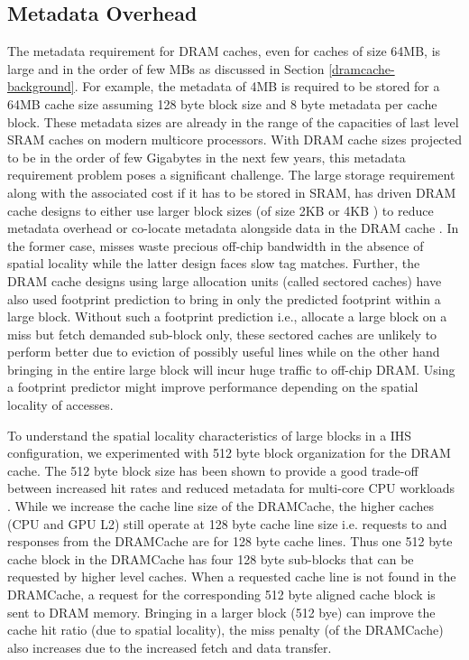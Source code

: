 \subsection{Metadata Overhead}
The metadata requirement for DRAM caches, even for caches of size 64MB, is large and in the order of few MBs as discussed in Section \ref{dramcache-background}. For example, the metadata of 4MB is required to be stored for a 64MB cache size assuming 128 byte block size and 8 byte metadata per cache block. These metadata sizes are  already in the range of the capacities of last level SRAM caches on modern multicore processors. With DRAM cache sizes projected to be in the order of few Gigabytes in the next few years, this metadata requirement problem poses a significant challenge. The large storage requirement along with the associated cost if it has to be stored in SRAM, has driven DRAM cache designs to either use larger block sizes (of size 2KB or 4KB \cite{footprint,unison-cache}) to reduce metadata overhead or co-locate metadata alongside data in the DRAM cache \cite{loh-hill,alloy,atcache}. 
In the former case, misses waste precious off-chip bandwidth in the absence of spatial locality while the latter design faces slow tag matches.
Further, the DRAM cache designs using large allocation units (called sectored caches) have also used footprint prediction \cite{footprint} to bring in only the predicted footprint within a large block. Without such a footprint prediction i.e., allocate a large block on a miss but fetch demanded sub-block only, these sectored caches are unlikely to perform better due to eviction of possibly useful lines while on the other hand bringing in the entire large block will incur huge traffic to off-chip DRAM. Using a footprint predictor might improve performance depending on the spatial locality of accesses.
\par To understand the spatial locality characteristics of large blocks in a IHS configuration, we experimented with 512 byte block organization for the DRAM cache. The 512 byte block size has been shown to provide a good trade-off between increased hit rates and reduced metadata for multi-core CPU workloads \cite{bimodal}. 
While we increase the cache line size of the DRAMCache, the higher caches (CPU and GPU L2) still operate at 128 byte cache line size i.e. requests to and responses from the DRAMCache are for 128 byte cache lines. Thus one 512 byte cache block in the DRAMCache has four 128 byte sub-blocks that can be requested by higher level caches. When a requested cache line is not found in the DRAMCache, a request for the corresponding 512 byte aligned cache block is sent to DRAM memory. Bringing in a larger block (512 bye) can improve the cache hit ratio (due to spatial locality), the miss penalty (of the DRAMCache) also increases due to the increased fetch and data transfer.
